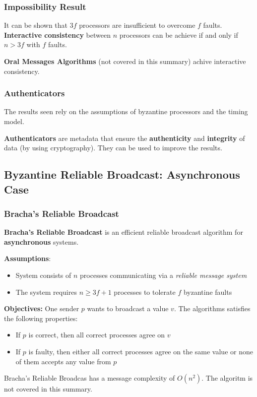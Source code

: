 \documentclass[12pt,A4]{extarticle}
\newcommand{\highlight}[1]{\textcolor{highlightColor}{\textbf{#1}}}
\begin{document}
\subsubsection{Impossibility Result}
It can be shown that $3f$ processors are insufficient to overcome $f$ faults. \textbf{Interactive consistency} between $n$ processors can be achieve if and only if $n > 3f$ with $f$ faults.\par
\textbf{Oral Messages Algorithms}\label{oralMessagesAlgorithm} (not covered in this summary) achive interactive consistency.

\subsubsection{Authenticators}
The results seen rely on the assumptions of byzantine processors and the timing model.\par
\highlight{Authenticators} are metadata that ensure the \textbf{authenticity} and \textbf{integrity} of data (by using cryptography). They can be used to improve the results.

\subsection{Byzantine Reliable Broadcast: Asynchronous Case}
\subsubsection{Bracha's Reliable Broadcast}
\highlight{Bracha's Reliable Broadcast} \cite{BRACHA1987130} is an efficient reliable broadcast algorithm for \textbf{asynchronous} systems.\par
\textbf{Assumptions}:
\begin{itemize}
  \item{System consists of $n$ processes communicating via a \textit{reliable message system}}
  \item{The system requires $n \geq 3f + 1$ processes to tolerate $f$ byzantine faults}
\end{itemize}
\textbf{Objectives:} One sender $p$ wants to broadcast a value $v$. The algorithms satisfies the following properties:
\begin{itemize}
  \item{If $p$ is correct, then all correct processes agree on $v$}
  \item{If $p$ is faulty, then either all correct processes agree on the same value or none of them accepts any value from $p$}
\end{itemize}
Bracha's Reliable Broadcas has a message complexity of $O(n^2)$. The algoritm is not covered in this summary.
\end{document}
